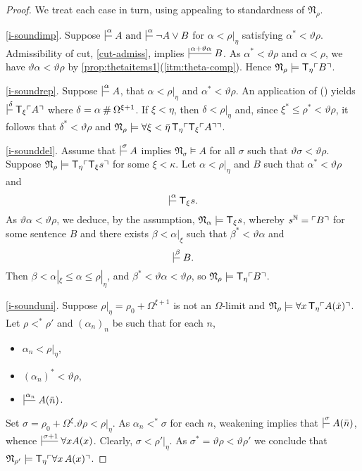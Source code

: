 \documentclass[UKenglish,cleveref,DIV=12]{scrartcl}
\theoremstyle{definition}
\theoremstyle{definition}
\newcommand{\gelnote}[1]{\note[magenta]{#1}}
\begin{document}
\begin{proof}
We treat each case in turn, using appealing to standardness of \( \mathfrak N_\rho \).

\ref{i-soundimp}. Suppose
\(
 \prov{\alpha}{A}\text{ and }\prov{\alpha}{\lnot A \vee B}
\) for \( \alpha < \rho|_\eta \) satisfying \( \alpha^* < \vartheta \rho \).
Admissibility of cut, \cref{cut-admiss}, implies $\prov{\alpha + \vartheta \alpha}{B}$.
As \( \alpha^* < \vartheta \rho \) and \( \alpha < \rho \), we have \( \vartheta \alpha < \vartheta \rho \) by \cref{prop:thetaitems1}(\ref{itm:theta-comp}).
Hence $\mathfrak N_\rho\models \mathsf{T}_\eta \ulcorner{B}\urcorner$.

\ref{i-soundrep}. Suppose \( \prov \alpha A \), that \( \alpha < \rho|_\eta \) and \( \alpha^* < \vartheta \rho \).
An application of (\Nec\eta) yields \( \prov{\delta} \T_\xi\gn A \) where \( \delta = \alpha \mathbin{\#} \Omega^{\xi+1} \). 
If \( \xi < \eta \), then \( \delta < \rho|_\eta \) and, since \( \xi^* \leq \rho^* < \vartheta\rho \), it follows that \( \delta^* < \vartheta \rho \) and \( \mathfrak N_\rho \models \forall \xi < \bar \eta \, \mathsf{T}_\eta \ulcorner{\mathsf{T}_\xi\ulcorner{A}\urcorner}\urcorner \).

\ref{i-sounddel}. Assume that \( \prov \sigma A \) implies \( \mathfrak N_\sigma \models A \) for all \( \sigma \) such that \( \vartheta \sigma < \vartheta \rho \). 
Suppose \( \mathfrak N_\rho \models \mathsf{T}_\eta \ulcorner{\mathsf{T}_\xi s}\urcorner \) for some \( \xi < \kappa \).
Let \( \alpha < \rho|_\eta \) and \( B \) such that \( \alpha^* < \vartheta \rho \) and
\[
	\prov \alpha \T_\xi s .
\]
As \( \vartheta \alpha < \vartheta \rho \), we deduce, by the assumption, \( \mathfrak N_\alpha \models \mathsf{T}_\xi s \), whereby \( s^\mathbb N = \ulcorner{B}\urcorner \) for some sentence \( B \) and there exists \( \beta < \alpha |_\xi \) such that \( \beta^* < \vartheta \alpha \) and 
\[
	\prov \beta B .
\]
Then \( \beta < \alpha|_\xi \le \alpha \le \rho|_\eta \), and \( \beta^* < \vartheta \alpha < \vartheta \rho \), so \( \mathfrak N_\rho \models \mathsf{T}_\eta \ulcorner{B}\urcorner \).


\ref{i-sounduni}. Suppose \( \rho|_\eta = \rho_0 + \Omega^{\xi+1} \) is not an \( \Omega \)-limit\gelnote{This is \( \Omega \)-limit} 
and $\mathfrak N_\rho\models \forall x\, \mathsf{T}_\eta \ulcorner{A(\dot x)}\urcorner$.
Let \( \rho <^* \rho' \) and \( (\alpha_n)_n \) be such that for each \( n \),
\begin{itemize}
	\item \( \alpha_n < \rho|_\eta \),
	\item \( (\alpha_n)^* < \vartheta\rho \),
	\item \( \prov {\alpha_n} A(\bar n) \).
\end{itemize}
Set \( \sigma = \rho_0 + \Omega^\xi. \vartheta\rho < \rho|_\eta \).
As \( \alpha_n <^* \sigma \) for each \( n \), weakening implies that \( \prov{\sigma} A(\bar n) \), whence \( \prov{\sigma+1} \forall x A(x) \).
Clearly, \( \sigma < \rho'|_\eta \). 
As \( \sigma^* = \vartheta\rho < \vartheta\rho' \) we conclude that \( \mathfrak N_{\rho'} \models \mathsf{T}_\eta \ulcorner{\forall x\,A(x)}\urcorner\).
\end{proof}
\end{document}
